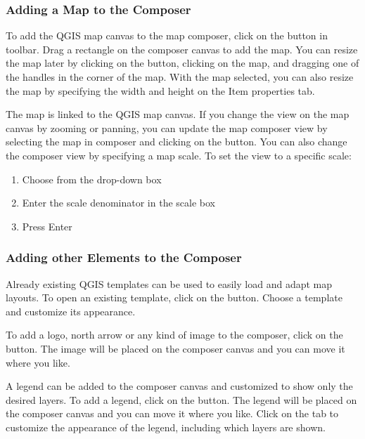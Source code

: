 \subsubsection{Adding a Map to the Composer}

To add the QGIS map canvas to the map composer, click on the
 button in toolbar. Drag a rectangle on the composer canvas to add the
map. You can resize the map later by clicking on the 
button, clicking on the map, and dragging one of the handles in the corner of
the map. With the map selected, you can also resize the map by specifying the
width and height on the Item properties tab.

The map is linked to the QGIS map canvas. If you change the view on the map
canvas by zooming or panning, you can update the map composer view by
selecting the map in composer and clicking on the  button.
You can also change the composer view by specifying a map scale. To set the
view to a specific scale:

\begin{enumerate}
\item Choose  from the  drop-down
box
\item Enter the scale denominator in the scale box
\item Press Enter
\end{enumerate} 

\subsubsection{Adding other Elements to the Composer} 
 
Already existing QGIS templates can be used to easily load and adapt map
layouts. To open an existing template, click on the
 button. Choose a template and
customize its appearance. 

To add a logo, north arrow or any  kind of image to the composer, click on
the  button. The image will 
be placed on the composer canvas and you can move it where you like. 

A legend can be added to the composer canvas and customized to show only the
desired layers. To add a legend, click on the
 button. The legend will be
placed on the composer canvas and you can move it where you like. Click on
the  tab to customize the appearance of the legend, including
which layers are shown.


